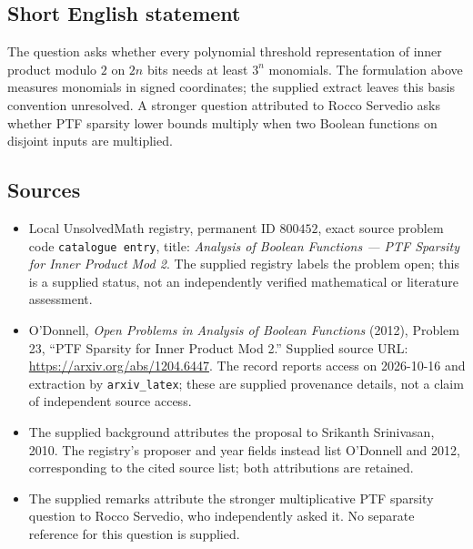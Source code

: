 \documentclass[11pt]{article}
\begin{document}
\subsection{Short English statement}
The question asks whether every polynomial threshold representation of inner product modulo \(2\) on \(2n\) bits needs at least \(3^n\) monomials. The formulation above measures monomials in signed coordinates; the supplied extract leaves this basis convention unresolved. A stronger question attributed to Rocco Servedio asks whether PTF sparsity lower bounds multiply when two Boolean functions on disjoint inputs are multiplied.
\subsection{Sources}
\begin{itemize}
\item Local UnsolvedMath registry, permanent ID \(800452\), exact source problem code \texttt{catalogue entry}, title: \emph{Analysis of Boolean Functions --- PTF Sparsity for Inner Product Mod 2}. The supplied registry labels the problem open; this is a supplied status, not an independently verified mathematical or literature assessment.
\item O'Donnell, \emph{Open Problems in Analysis of Boolean Functions} (2012), Problem 23, ``PTF Sparsity for Inner Product Mod 2.'' Supplied source URL: \url{https://arxiv.org/abs/1204.6447}. The record reports access on 2026-10-16 and extraction by \texttt{arxiv\_latex}; these are supplied provenance details, not a claim of independent source access.
\item The supplied background attributes the proposal to Srikanth Srinivasan, 2010. The registry's proposer and year fields instead list O'Donnell and 2012, corresponding to the cited source list; both attributions are retained.
\item The supplied remarks attribute the stronger multiplicative PTF sparsity question to Rocco Servedio, who independently asked it. No separate reference for this question is supplied.
\end{itemize}
\end{document}
